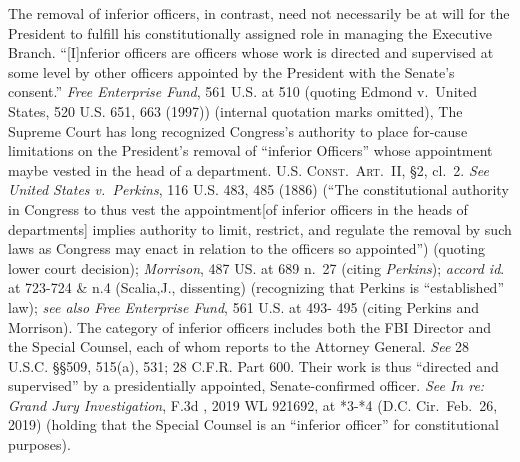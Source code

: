 The removal of inferior officers, in contrast, need not necessarily be at will for the President to fulfill his constitutionally assigned role in managing the Executive Branch.
“[I]nferior officers are officers whose work is directed and supervised at some level by other officers appointed by the President with the Senate’s consent.”
\textit{Free Enterprise Fund}, 561 U.S. at 510 (quoting Edmond v.\ United States, 520 U.S. 651, 663 (1997)) (internal quotation marks omitted), The Supreme Court has long recognized Congress’s authority to place for-cause limitations on the President’s removal of “inferior Officers” whose appointment maybe vested in the head of a department.
\textsc{U.S. Const.\ Art.~II}, \S 2, cl.~2.
\textit{See United States v.\ Perkins}, 116 U.S. 483, 485 (1886) (“The constitutional authority in Congress to thus vest the appointment[of inferior officers in the heads of departments] implies authority to limit, restrict, and regulate the removal by such laws as Congress may enact in relation to the officers so appointed”) (quoting lower court decision);
\textit{Morrison}, 487 US. at 689 n.~27 (citing \textit{Perkins});
\textit{accord id}. at 723-724 \& n.4 (Scalia,J., dissenting) (recognizing that Perkins is “established” law);
\textit{see also Free Enterprise Fund}, 561 U.S. at 493- 495 (citing Perkins and Morrison).
The category of inferior officers includes both the FBI Director and the Special Counsel, each of whom reports to the Attorney General.
\textit{See} 28 U.S.C. \S\S 509, 515(a), 531; 28 C.F.R. Part 600.
Their work is thus “directed and supervised” by a presidentially appointed, Senate-confirmed officer.
\textit{See In re: Grand Jury Investigation}, \textunderscore\textunderscore F.3d \textunderscore\textunderscore, 2019 WL 921692, at *3-*4 (D.C. Cir.\ Feb.~26, 2019) (holding that the Special Counsel is an “inferior officer” for constitutional purposes).

